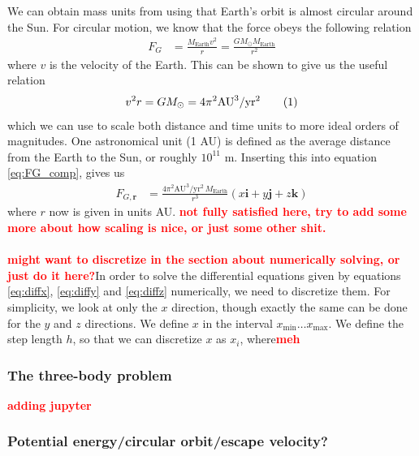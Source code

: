 \documentclass{article}
\newcommand\red[1]{\textcolor{red}{\textbf{#1}}}
\newcommand\numberthis{\addtocounter{equation}{1}\tag{\theequation}}
\begin{document}
We can obtain mass units from using that Earth's orbit is almost circular around the Sun. For circular motion, we know that the force obeys the following relation
\begin{align*}
F_G &= \frac{M_{\text{Earth}}v^2}{r} = \frac{GM_{\odot}M_{\text{Earth}}}{r^2}
\end{align*}
where $v$ is the velocity of the Earth. This can be shown to give us the useful relation
\begin{align*}
  v^2r = GM_{\odot} = 4\pi^2\text{AU}^3/\text{yr}^2\numberthis\label{eq:mass_units}
\end{align*}
which we can use to scale both distance and time units to more ideal orders of magnitudes. One astronomical unit (1 AU) is defined as the average distance from the Earth to the Sun, or roughly $10^{11}$ m. Inserting this into equation \eqref{eq:FG_comp}, gives us
\begin{align*}
  F_{G,\mathbf{r}} &= \frac{4\pi^2\text{AU}^3/\text{yr}^2\,M_{\text{Earth}}}{r^3}(x\mathbf{i}+y\mathbf{j}+z\mathbf{k})
\end{align*} 
where $r$ now is given in units AU. \red{not fully satisfied here, try to add some more about how scaling is nice, or just some other shit.}
\\\\
\red{might want to discretize in the section about numerically solving, or just do it here?}In order to solve the differential equations given by equations \eqref{eq:diffx}, \eqref{eq:diffy} and \eqref{eq:diffz} numerically, we need to discretize them. For simplicity, we look at only the $x$ direction, though exactly the same can be done for the $y$ and $z$ directions. We define $x$ in the interval $x_{\text{min}} \dots x_{\text{max}}$. We define the step length $h$, so that we can discretize $x$ as $x_i$, where\red{meh}
\subsubsection{The three-body problem}
\red{adding jupyter}
\subsubsection{Potential energy/circular orbit/escape velocity?}
\end{document}
